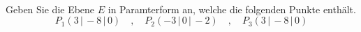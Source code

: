 \begin{aufgabe} ~ \\ 
Geben Sie die Ebene $E$ in Paramterform an, welche die folgenden Punkte enthält.\[P_1( 3\,|\,-8\,|\,0) \quad,\quad P_2( -3\,|\,0\,|\,-2) \quad,\quad P_3( 3\,|\,-8\,|\,0)\]\end{aufgabe} 
